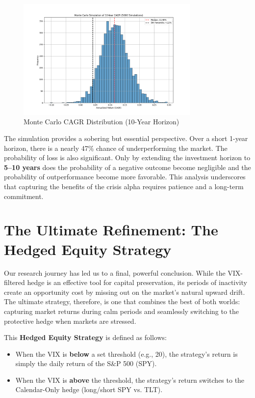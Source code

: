 \documentclass{article}
\begin{document}
\begin{figure}[htbp]
\centering
\includegraphics[width=0.8\textwidth]{plots/plot_monte_carlo.png}
\caption{Monte Carlo CAGR Distribution (10-Year Horizon)}
\end{figure}

The simulation provides a sobering but essential perspective. Over a short 1-year horizon, there is a nearly 47\% chance of underperforming the market. The probability of loss is also significant. Only by extending the investment horizon to \textbf{5--10 years} does the probability of a negative outcome become negligible and the probability of outperformance become more favorable. This analysis underscores that capturing the benefits of the crisis alpha requires patience and a long-term commitment.

\vspace{1em}
\hrulefill

\section{The Ultimate Refinement: The Hedged Equity Strategy}
Our research journey has led us to a final, powerful conclusion. While the VIX-filtered hedge is an effective tool for capital preservation, its periods of inactivity create an opportunity cost by missing out on the market's natural upward drift. The ultimate strategy, therefore, is one that combines the best of both worlds: capturing market returns during calm periods and seamlessly switching to the protective hedge when markets are stressed.

This \textbf{Hedged Equity Strategy} is defined as follows:
\begin{itemize}
    \item When the VIX is \textbf{below} a set threshold (e.g., 20), the strategy's return is simply the daily return of the S\&P 500 (SPY).
    \item When the VIX is \textbf{above} the threshold, the strategy's return switches to the Calendar-Only hedge (long/short SPY vs. TLT).
\end{itemize}
\end{document}
